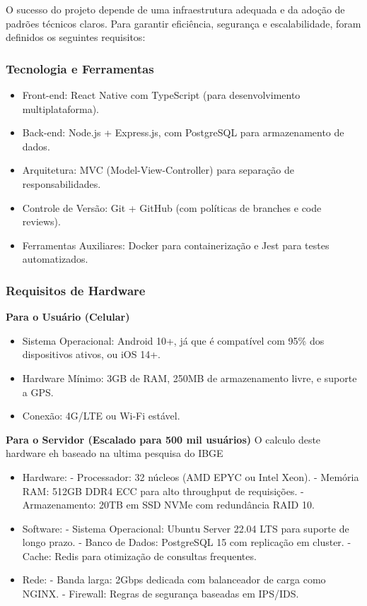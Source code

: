 \documentclass[a5paper, 12pt]{article}
\begin{document}
O sucesso do projeto depende de uma infraestrutura adequada e da adoção de padrões técnicos claros. Para garantir eficiência, segurança e escalabilidade, foram definidos os seguintes requisitos:

\subsubsection{Tecnologia e Ferramentas}
\begin{itemize}[]
\item Front-end: React Native com TypeScript (para desenvolvimento multiplataforma).
\item Back-end: Node.js + Express.js, com PostgreSQL para armazenamento de dados.
\item Arquitetura: MVC (Model-View-Controller) para separação de responsabilidades.
\item Controle de Versão: Git + GitHub (com políticas de branches e code reviews).
\item Ferramentas Auxiliares: Docker para containerização e Jest para testes automatizados.
\end{itemize}

\subsubsection{Requisitos de Hardware}

\textbf{Para o Usuário (Celular)}
\begin{itemize}[]
\item Sistema Operacional: Android 10+, já que é compatível com 95\% dos dispositivos ativos, ou iOS 14+.
\item Hardware Mínimo: 3GB de RAM, 250MB de armazenamento livre, e suporte a GPS.
\item Conexão: 4G/LTE ou Wi-Fi estável.
\end{itemize}

\textbf{Para o Servidor (Escalado para 500 mil usuários)}
O calculo deste hardware eh baseado na ultima pesquisa do IBGE \cite{ibge-2022}
\begin{itemize}[]
\item Hardware:
- Processador: 32 núcleos (AMD EPYC ou Intel Xeon).
- Memória RAM: 512GB DDR4 ECC para alto throughput de requisições.
- Armazenamento: 20TB em SSD NVMe com redundância RAID 10.
\item Software:
- Sistema Operacional: Ubuntu Server 22.04 LTS para suporte de longo prazo.
- Banco de Dados: PostgreSQL 15 com replicação em cluster.
- Cache: Redis para otimização de consultas frequentes.
\item Rede:
- Banda larga: 2Gbps dedicada com balanceador de carga como NGINX.
- Firewall: Regras de segurança baseadas em IPS/IDS.
\end{itemize}
\end{document}
